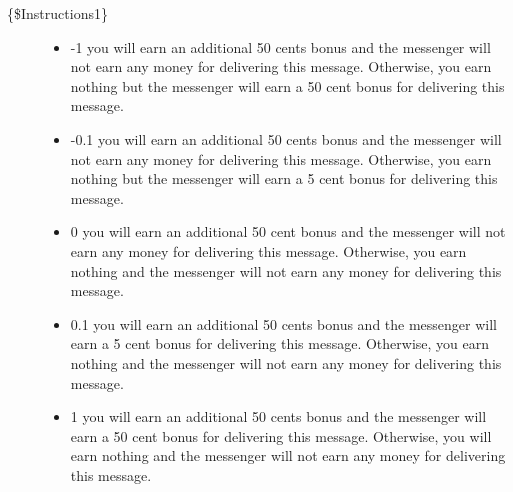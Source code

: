\begin{description}
\item[\{\$Instructions1\}] \hspace{1cm}

\begin{itemize}
\item -1 you will earn an additional 50 cents bonus and the messenger will not
earn any money for delivering this message. Otherwise, you earn nothing but the
messenger will earn a 50 cent bonus for delivering this message.

\item -0.1 you will earn an additional 50 cents bonus and the messenger will
not earn any money for delivering this message. Otherwise, you earn nothing but
the messenger will earn a 5 cent bonus for delivering this message.

\item 0 you will earn an additional 50 cent bonus and the messenger will not
earn any money for delivering this message. Otherwise, you earn nothing and the
messenger will not earn any money for delivering this message.

\item 0.1 you will earn an additional 50 cents bonus and the messenger will
earn a 5 cent bonus for delivering this message. Otherwise, you earn nothing and
the messenger will not earn any money for delivering this message.

\item 1 you will earn an additional 50 cents bonus and the messenger will earn
a 50 cent bonus for delivering this message. Otherwise, you will earn nothing
and the messenger will not earn any money for delivering this message.
\end{itemize}
\end{description}

